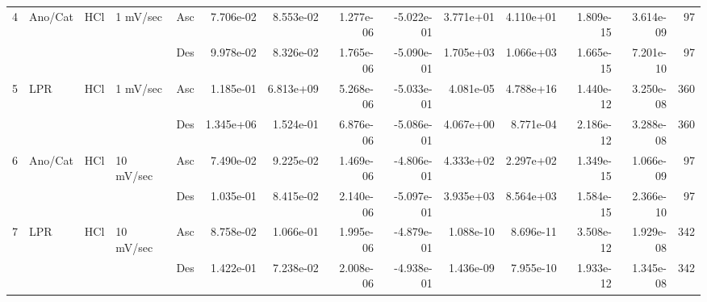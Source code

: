\begin{tabular}{lllllrrrrrrrrr}
4 & Ano/Cat & HCl & 1 mV/sec & Asc &  7.706e-02 &     8.553e-02 &              1.277e-06 &                -5.022e-01 &        3.771e+01 &           4.110e+01 &             1.809e-15 &                       3.614e-09 &   97 \\
  &     &     &           & Des &  9.978e-02 &     8.326e-02 &              1.765e-06 &                -5.090e-01 &        1.705e+03 &           1.066e+03 &             1.665e-15 &                       7.201e-10 &   97 \\
5 & LPR & HCl & 1 mV/sec & Asc &  1.185e-01 &     6.813e+09 &              5.268e-06 &                -5.033e-01 &        4.081e-05 &           4.788e+16 &             1.440e-12 &                       3.250e-08 &  360 \\
  &     &     &           & Des &  1.345e+06 &     1.524e-01 &              6.876e-06 &                -5.086e-01 &        4.067e+00 &           8.771e-04 &             2.186e-12 &                       3.288e-08 &  360 \\
6 & Ano/Cat & HCl & 10 mV/sec & Asc &  7.490e-02 &     9.225e-02 &              1.469e-06 &                -4.806e-01 &        4.333e+02 &           2.297e+02 &             1.349e-15 &                       1.066e-09 &   97 \\
  &     &     &           & Des &  1.035e-01 &     8.415e-02 &              2.140e-06 &                -5.097e-01 &        3.935e+03 &           8.564e+03 &             1.584e-15 &                       2.366e-10 &   97 \\
7 & LPR & HCl & 10 mV/sec & Asc &  8.758e-02 &     1.066e-01 &              1.995e-06 &                -4.879e-01 &        1.088e-10 &           8.696e-11 &             3.508e-12 &                       1.929e-08 &  342 \\
  &     &     &           & Des &  1.422e-01 &     7.238e-02 &              2.008e-06 &                -4.938e-01 &        1.436e-09 &           7.955e-10 &             1.933e-12 &                       1.345e-08 &  342 \\
\bottomrule
\end{tabular}
